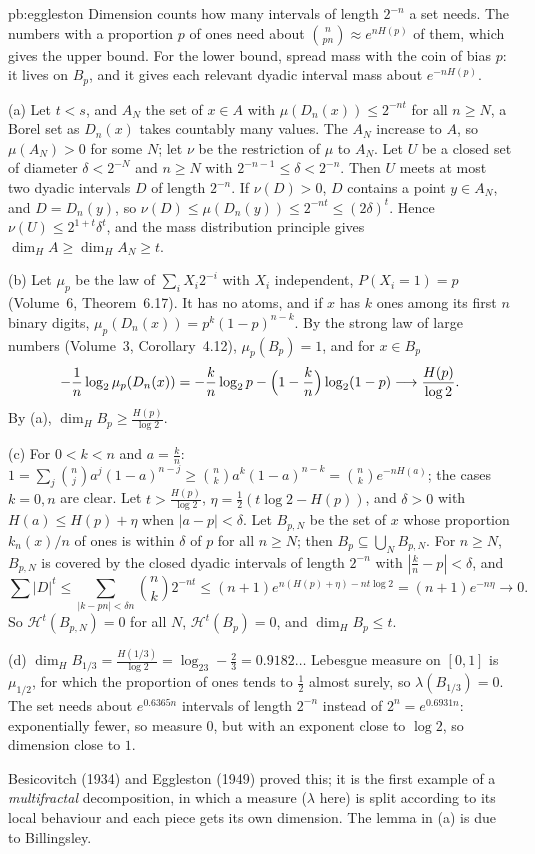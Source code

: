 \begin{solution}{pb:eggleston}
\idea Dimension counts how many intervals of length $2^{-n}$ a set needs. The numbers with a proportion $p$ of ones need about $\binom n{pn}\approx e^{nH(p)}$ of
them, which gives the upper bound. For the lower bound, spread mass with the coin of bias $p$: it lives on $B_p$, and it gives each relevant dyadic interval
mass about $e^{-nH(p)}$.

\writeup (a) Let $t<s$, and $A_N$ the set of $x\in A$ with $\mu(D_n(x))\le2^{-nt}$ for all $n\ge N$, a Borel set as $D_n(x)$ takes countably many values. The $A_N$ increase
to $A$, so $\mu(A_N)>0$ for some $N$; let $\nu$ be the restriction of $\mu$ to $A_N$. Let $U$ be a closed set of diameter $\delta<2^{-N}$ and $n\ge N$ with
$2^{-n-1}\le\delta<2^{-n}$. Then $U$ meets at most two dyadic intervals $D$ of length $2^{-n}$. If $\nu(D)>0$, $D$ contains a point $y\in A_N$, and $D=D_n(y)$, so
$\nu(D)\le\mu(D_n(y))\le2^{-nt}\le(2\delta)^t$. Hence $\nu(U)\le2^{1+t}\delta^t$, and the mass distribution principle gives $\dim_HA\ge\dim_HA_N\ge t$.

(b) Let $\mu_p$ be the law of $\sum_iX_i2^{-i}$ with $X_i$ independent, $P(X_i=1)=p$ (Volume~6, Theorem~6.17). It has no atoms, and if $x$ has $k$ ones among its first $n$
binary digits, $\mu_p(D_n(x))=p^k(1-p)^{n-k}$. By the strong law of large numbers (Volume~3, Corollary~4.12), $\mu_p(B_p)=1$, and for $x\in B_p$
\[
-\frac1n\log_2\mu_p(D_n(x))=-\frac kn\log_2p-\Bigl(1-\frac kn\Bigr)\log_2(1-p)\longrightarrow\frac{H(p)}{\log2}.
\]
By (a), $\dim_HB_p\ge\frac{H(p)}{\log2}$.

(c) For $0<k<n$ and $a=\frac kn$: $1=\sum_j\binom nja^j(1-a)^{n-j}\ge\binom nka^k(1-a)^{n-k}=\binom nke^{-nH(a)}$; the cases $k=0,n$ are clear. Let
$t>\frac{H(p)}{\log2}$, $\eta=\frac12(t\log2-H(p))$, and $\delta>0$ with $H(a)\le H(p)+\eta$ when $|a-p|<\delta$. Let $B_{p,N}$ be the set of $x$ whose proportion
$k_n(x)/n$ of ones is within $\delta$ of $p$ for all $n\ge N$; then $B_p\subseteq\bigcup_NB_{p,N}$. For $n\ge N$, $B_{p,N}$ is covered by the closed dyadic intervals of
length $2^{-n}$ with $|\frac kn-p|<\delta$, and
\[
\sum|D|^t\le\sum_{|k-pn|<\delta n}\binom nk2^{-nt}\le(n+1)e^{n(H(p)+\eta)-nt\log2}=(n+1)e^{-n\eta}\longrightarrow0.
\]
So $\mathcal H^t(B_{p,N})=0$ for all $N$, $\mathcal H^t(B_p)=0$, and $\dim_HB_p\le t$.

(d) $\dim_HB_{1/3}=\frac{H(1/3)}{\log2}=\log_23-\frac23=0.9182\ldots$ Lebesgue measure on $[0,1]$ is $\mu_{1/2}$, for which the proportion of ones tends to $\frac12$ almost
surely, so $\lambda(B_{1/3})=0$. The set needs about $e^{0.6365n}$ intervals of length $2^{-n}$ instead of $2^n=e^{0.6931n}$: exponentially fewer, so measure $0$,
but with an exponent close to $\log2$, so dimension close to $1$.

\leads Besicovitch (1934) and Eggleston (1949) proved this; it is the first example of a \emph{multifractal} decomposition, in which a measure ($\lambda$ here) is
split according to its local behaviour and each piece gets its own dimension. The lemma in (a) is due to Billingsley.
\end{solution}

